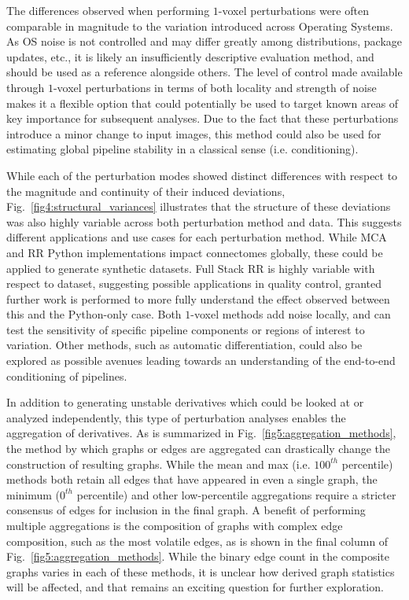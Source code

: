 \documentclass[fleqn,12pt]{SelfArx_ch} %
\begin{document}
The differences observed when performing $1$-voxel perturbations were often comparable in magnitude to the variation
introduced across Operating Systems. As OS noise is not controlled and may differ greatly among distributions, package
updates, etc., it is likely an insufficiently descriptive evaluation method, and should be used as a reference
alongside others. The level of control made available through $1$-voxel perturbations in terms of both locality and
strength of noise makes it a flexible option that could potentially be used to target known areas of key importance for
subsequent analyses. Due to the fact that these perturbations introduce a minor change to input images, this method
could also be used for estimating global pipeline stability in a classical sense (i.e. conditioning).

While each of the perturbation modes showed distinct differences with respect to the magnitude and continuity of their
induced deviations, Fig.~\ref{fig4:structural_variances} illustrates that the structure of these deviations was also
highly variable across both perturbation method and data. This suggests different applications and use cases for each
perturbation method. While MCA and RR Python implementations impact connectomes globally, these could be applied to
generate synthetic datasets. Full Stack RR is highly variable with respect to dataset, suggesting possible applications
in quality control, granted further work is performed to more fully understand the effect observed between this and the
Python-only case. Both $1$-voxel methods add noise locally, and can test the sensitivity of specific pipeline
components or regions of interest to variation. Other methods, such as automatic differentiation, could also be
explored as possible avenues leading towards an understanding of the end-to-end conditioning of pipelines.

In addition to generating unstable derivatives which could be looked at or analyzed independently, this type of
perturbation analyses enables the aggregation of derivatives. As is summarized in Fig.~\ref{fig5:aggregation_methods},
the method by which graphs or edges are aggregated can drastically change the construction of resulting graphs. While
the mean and max (i.e. $100^{th}$ percentile) methods both retain all edges that have appeared in even a single graph,
the minimum ($0^{th}$ percentile) and other low-percentile aggregations require a stricter consensus of edges for
inclusion in the final graph. A benefit of performing multiple aggregations is the composition of graphs with complex
edge composition, such as the most volatile edges, as is shown in the final column of
Fig.~\ref{fig5:aggregation_methods}. While the binary edge count in the composite graphs varies in each of these
methods, it is unclear how derived graph statistics will be affected, and that remains an exciting question for further
exploration.
\end{document}
